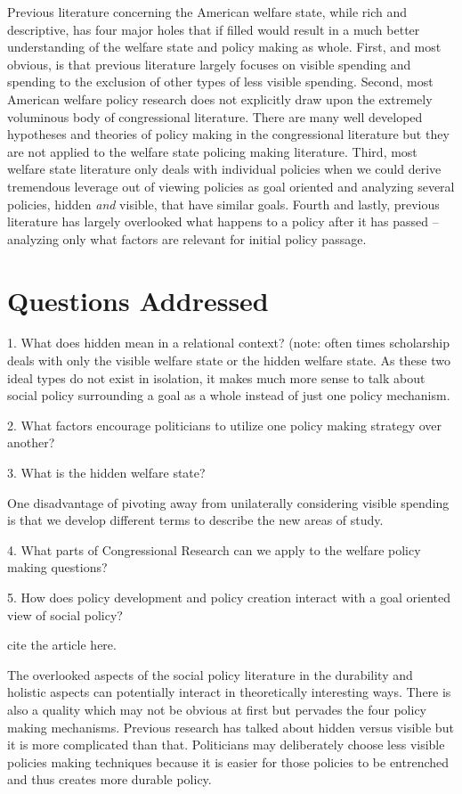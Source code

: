 \documentclass[12pt]{article}
\begin{document}
Previous literature concerning the American welfare state, while rich and descriptive, has four major holes that if filled would result in a much better understanding of the welfare state and policy making as whole. First, and most obvious, is that previous literature largely focuses on visible spending and spending to the exclusion of other types of less visible spending. Second, most American welfare policy research does not explicitly draw upon the extremely voluminous body of congressional literature. There are many well developed hypotheses and theories of policy making in the congressional literature but they are not applied to the welfare state policing making literature. Third, most welfare state literature only deals with individual policies when we could derive tremendous leverage out of viewing policies as goal oriented and analyzing several policies, hidden \emph{and} visible, that have similar goals. Fourth and lastly, previous literature has largely overlooked what happens to a policy after it has passed -- analyzing only what factors are relevant for initial policy passage.

 
\section{Questions Addressed}

1. What does hidden mean in a relational context?
(note: often times scholarship deals with only the visible welfare state or the hidden welfare state. As these two ideal types do not exist in isolation, it makes much more sense to talk about social policy surrounding a goal as a whole instead of just one policy mechanism.

2. What factors encourage politicians to utilize one policy making strategy over another?

3. What is the hidden welfare state? 

One disadvantage of pivoting away from unilaterally considering visible spending is that we develop different terms to describe the new areas of study.

4. What parts of Congressional Research can we apply to the welfare policy making questions?

5. How does policy development and policy creation interact with a goal oriented view of social policy?

cite the \citep{pierson2004b} article here.

\citep{elving1996}


The overlooked aspects of the social policy literature in the durability and holistic aspects can potentially interact in theoretically interesting ways.
There is also a quality which may not be obvious at first but pervades the four policy making mechanisms. Previous research has talked about hidden versus visible but it is more complicated than that. Politicians may deliberately choose less visible policies making techniques because it is easier for those policies to be entrenched and thus creates more durable policy.
\end{document}
